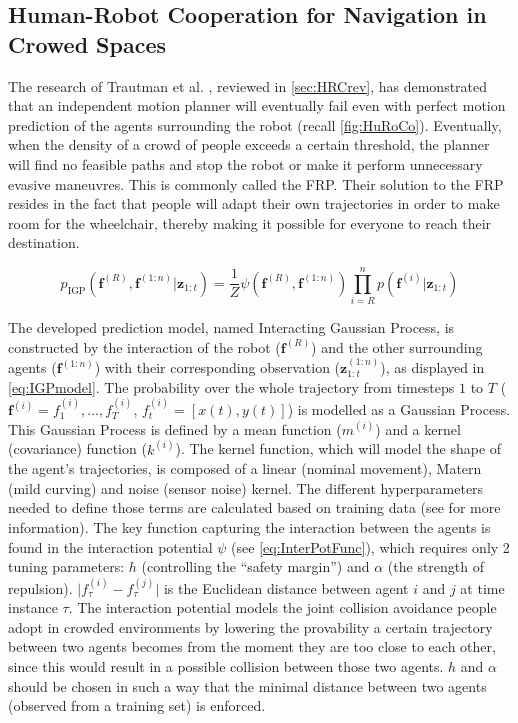 \subsection{Human-Robot Cooperation for Navigation in Crowed Spaces} \label{sec:Cooperation}
The research of Trautman et al. \cite{TrautmanKrause2010,TrautmanEtAl2015}, reviewed in \cref{sec:HRCrev}, has demonstrated that an independent motion planner will eventually fail even with perfect motion prediction of the agents surrounding the robot (recall \cref{fig:HuRoCo}). Eventually, when the density of a crowd of people exceeds a certain threshold, the planner will find no feasible paths and stop the robot or make it perform unnecessary evasive maneuvres. This is commonly called the FRP. Their solution to the FRP resides in the fact that people will adapt their own trajectories in order to make room for the wheelchair, thereby making it possible for everyone to reach their destination.

\begin{equation}
p_{\text{IGP}}({\bm f}^{(R)}, {\bm f^{(1:n)}}\vert {\bm z}_{1:t})=\frac{1}{Z}\psi({\bm f}^{(R)}, {\bm f^{(1:n)}})\prod\limits_{i=R}^{n}p({\bm f}^{(i)}\vert{\bm z}_{1:t}) \label{eq:IGPmodel}
\end{equation}

The developed prediction model, named Interacting Gaussian Process, is constructed by the interaction of the robot (${\bm f}^{(R)}$) and the other surrounding agents (${\bm f}^{(1:n)}$) with their corresponding observation (${\bm z}^{(1:n)}_{1:t}$), as displayed in \cref{eq:IGPmodel}. The probability over the whole trajectory from timesteps $1$ to $T$ (${\bm f}^{(i)} = f_{1}^{(i)}, \ldots, f_{T}^{({i})}$, $f^{(i)}_t = [x(t),y(t)]$) is modelled as a Gaussian Process. This Gaussian Process is defined by a mean function ($m^{(i)}$) and a kernel (covariance) function ($k^{(i)}$). The kernel function, which will model the shape of the agent's trajectories, is composed of a linear (nominal movement), Matern (mild curving) and noise (sensor noise) kernel. The different hyperparameters needed to define those terms are calculated based on training data (see \cite{TrautmanEtAl2015} for more information). The key function capturing the interaction between the agents is found in the interaction potential $\psi$ (see \cref{eq:InterPotFunc}), which requires only 2 tuning parameters: $h$ (controlling the ``safety margin'') and $\alpha$ (the strength of repulsion). $\vert f_{\tau}^{(i)}-f_{\tau}^{(j)}\vert$ is the Euclidean distance between agent $i$ and $j$ at time instance $\tau$. The interaction potential models the joint collision avoidance people adopt in crowded environments by lowering the provability a certain trajectory between two agents becomes from the moment they are too close to each other, since this would result in a possible collision between those two agents. $h$ and  $\alpha$ should be chosen in such a way that the minimal distance between two agents (observed from a training set) is enforced.

